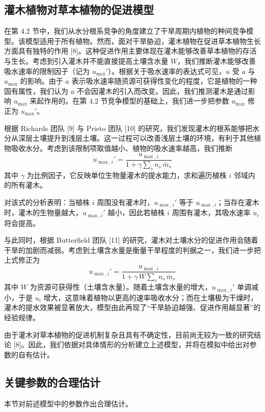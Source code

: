 \documentclass[11pt,a4paper]{ctexart}
\begin{document}
\subsection{灌木植物对草本植物的促进模型}

在第 4.2 节中，我们从水分根系竞争的角度建立了干旱周期内植物的种间竞争模型。该模型适用于所有植物。然而，面对干旱胁迫，灌木植物在促进草本植物生长方面具有独特的作用 [8]。这种促进作用主要体现在灌木能够改善草本植物的存活与生长。考虑到引入灌木并不能直接提高土壤含水量 $W$，我们推断灌木能够改善吸水速率的限制因子（记为 $u_{\max}'$）。根据关于吸水速率的表达式可见，$u$ 受 $a$ 与 $u_{\max}$ 的影响。由于 $a$ 表示吸水速率随资源可获得性变化的程度，它是植物的一种固有属性，我们认为 $a$ 不会因灌木的引入而改变。因此，我们推测灌木是通过影响 $u_{\max}$ 来起作用的。在第 4.2 节竞争模型的基础上，我们进一步把参数 $u_{\max}$ 修正为 $u_{\max}'$。

根据 Richards 团队 [9] 与 Prieto 团队 [10] 的研究，我们发现灌木的根系能够把水分从深层土壤提升到浅层土壤。这一过程可以改善浅层土壤的环境，有利于其他植物吸收水分。考虑到该限制项取值越小、植物的吸水速率越高，我们推断
\[
u_{\max,i}'=\frac{u_{\max,i}}{1+\gamma\displaystyle\sum_{s}n_s\,\bar m_s}
\]
其中 $\gamma$ 为比例因子，它反映单位生物量灌木的提水能力，求和遍历植株 $i$ 邻域内的所有灌木。

对该式的分析表明：当植株 $i$ 周围没有灌木时，$u_{\max,i}'$ 等于 $u_{\max,i}$；当存在灌木时，灌木的生物量越大，$u_{\max,i}'$ 越小，因此若植株 $i$ 周围有灌木，其吸水速率 $u_i$ 将会提高。

与此同时，根据 Butterfield 团队 [11] 的研究，灌木对土壤水分的促进作用会随着干旱的加剧而减弱。考虑到土壤含水量是衡量干旱程度的判据之一，我们进一步把上式修正为
\[
u_{\max,i}'=\frac{u_{\max,i}}{1+\gamma\,W\displaystyle\sum_{s}n_s\,\bar m_s}
\]
其中 $W$ 为资源可获得性（土壤含水量）。随着土壤含水量的增大，$u_{\max,i}'$ 单调减小，于是 $u_i$ 增大，这意味着植物以更高的速率吸收水分；而在土壤极为干燥时，灌木的提水效果被显著放大，模型由此再现了“干旱胁迫越强、促进作用越显著”的经验规律。

由于灌木对草本植物的促进机制复杂且具有不确定性，目前尚无较为一致的研究结论 [8]。因此，我们依据对具体情形的分析建立上述模型，并将在模拟中给出对参数的自有估计。

\subsection{关键参数的合理估计}

本节对前述模型中的参数作出合理估计。
\end{document}
